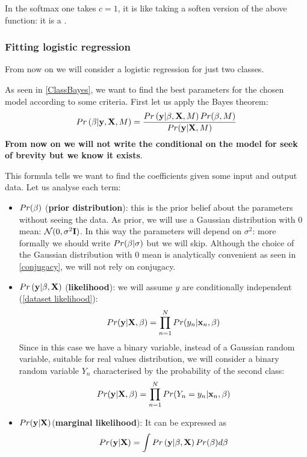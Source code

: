 In the softmax one takes $c=1$, it is like taking a soften version of the above function: it is a .

\subsubsection{Fitting logistic regression}
From now on we will consider a logistic regression for just two classes. 

As seen in \autoref{ClassBayes}, we want to find the best parameters for the chosen model according to some criteria. First let us apply the Bayes theorem:
\begin{equation}
Pr\left(\mathbf{\beta}|\mathbf{y},\mathrm{\mathbf{X}},M\right) = \frac{Pr\left(\mathbf{y}|\mathbf{\beta},\mathrm{\mathbf{X}},M\right) Pr(\mathbf{\beta},M)}{Pr(\mathbf{y}|\mathrm{\mathbf{X}},M)}
\end{equation}
\textbf{From now on we will not write the conditional on the model for seek of brevity but we know it exists}.

This formula tells we want to find the coefficients given some input and output data. Let us analyse each term:
\begin{itemize}
\item $Pr(\mathbf{\beta})$ (\textbf{prior distribution}): this is the prior belief about the parameters without seeing the data. As prior, we will use a Gaussian distribution with $0$ mean:  $\CMcal{N}(0, \sigma^2\I)$. In this way the parameters will depend on $\sigma^2$: more formally we should write $Pr(\mathbf{\beta}|\sigma)$ but we will skip. Although the choice of the Gaussian distribution with $0$ mean is analytically convenient as seen in \autoref{conjugacy}, we will not rely on conjugacy.
\item $Pr\left(\mathbf{y}|\mathbf{\beta},\mathrm{\mathbf{X}}\right)$ (\textbf{likelihood}): we will assume $y$ are conditionally independent (\autoref{dataset likelihood}):
\begin{equation}
Pr(\mathbf{y}|\mathrm{\mathbf{X}}, \mathbf{\beta}) = \prod_{n=1}^N Pr(y_n|\mathbf{x}_n, \mathbf{\beta})
\end{equation}
Since in this case we have a binary variable, instead of a Gaussian random variable, suitable for real values distribution, we will consider a binary random variable $Y_n$ characterised by the probability of the second class:
\begin{equation}
Pr(\mathbf{y}|\mathrm{\mathbf{X}}, \mathbf{\beta}) = \prod_{n=1}^N Pr(Y_n=y_n|\mathbf{x}_n, \mathbf{\beta})
\end{equation}
\item $Pr(\mathbf{y}|\mathrm{\mathbf{X}})$(\textbf{marginal likelihood}): It can be expressed as 
\begin{equation}
Pr(\mathbf{y}|\mathrm{\mathbf{X}}) = \int Pr\left(\mathbf{y}|\mathbf{\beta},\mathrm{\mathbf{X}}\right) Pr(\mathbf{\beta}) d\mathbf{\beta}
\end{equation}
\end{itemize}

